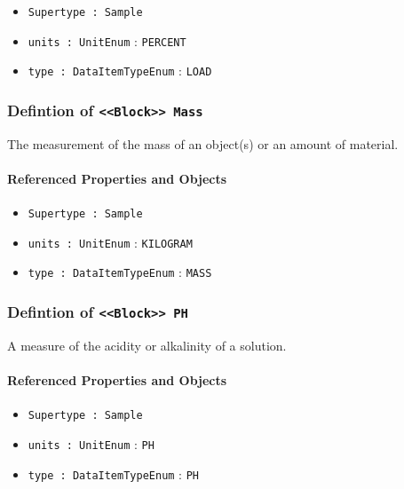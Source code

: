 \begin{itemize}
\item \texttt{Supertype : Sample}

\item \texttt{units : UnitEnum} : \texttt{PERCENT}

\item \texttt{type : DataItemTypeEnum} : \texttt{LOAD}

\end{itemize}
\FloatBarrier
\subsubsection{Defintion of \texttt{<<Block>> Mass}}
  \label{type:Mass}

\FloatBarrier

The measurement of the mass of an object(s) or an amount of material.

\FloatBarrier
\paragraph{Referenced Properties and Objects}

\begin{itemize}
\item \texttt{Supertype : Sample}

\item \texttt{units : UnitEnum} : \texttt{KILOGRAM}

\item \texttt{type : DataItemTypeEnum} : \texttt{MASS}

\end{itemize}
\FloatBarrier
\subsubsection{Defintion of \texttt{<<Block>> PH}}
  \label{type:PH}

\FloatBarrier

A measure of the acidity or alkalinity of a solution.

\FloatBarrier
\paragraph{Referenced Properties and Objects}

\begin{itemize}
\item \texttt{Supertype : Sample}

\item \texttt{units : UnitEnum} : \texttt{PH}

\item \texttt{type : DataItemTypeEnum} : \texttt{PH}

\end{itemize}
\FloatBarrier
